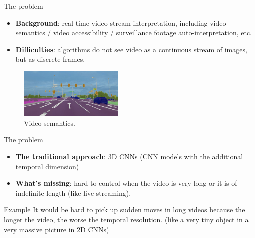 \documentclass[aspectratio=43,display]{beamer}
\begin{document}
		\begin{frame}{The problem}


			\begin{itemize}
				\item \textbf{Background}: real-time video stream interpretation, including video semantics / video accessibility / surveillance footage auto-interpretation, etc.
				\item \textbf{Difficulties}: algorithms do not see video as a continuous stream of images, but as discrete frames.
			\end{itemize}

			\vskip 0.3cm

			\begin{figure}
				\includegraphics[width=5cm]{images/image-semantics.jpeg}
				\caption{\label{fig:Video-Semantics}Video semantics.}
			\end{figure}


		\end{frame}


		\begin{frame}{The problem}

			\begin{itemize}
				\item \textbf{The traditional approach}: 3D CNNs (CNN models with the additional temporal dimension)
				\item \textbf{What's missing}: hard to control when the video is very long or it is of indefinite length (like live streaming).
			\end{itemize}

			\vskip 0.5cm

			\begin{block}{Example}
				It would be hard to pick up sudden moves in long videos because the longer the video, the worse the temporal resolution.
				(like a very tiny object in a very massive picture in 2D CNNs)
			\end{block}

		\end{frame}
\end{document}
